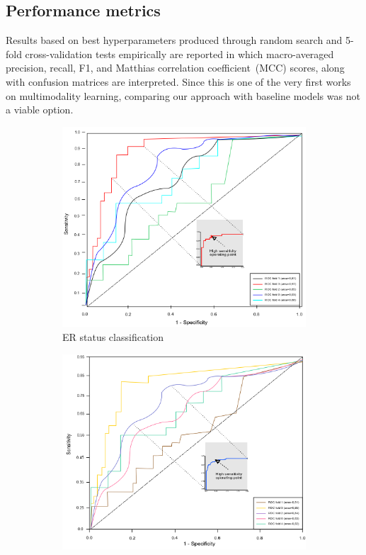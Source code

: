 \subsection{Performance metrics}
Results based on best hyperparameters produced through random search and 5-fold cross-validation tests empirically are reported in which macro-averaged precision, recall, F1, and Matthias correlation coefficient~(MCC) scores, along with confusion matrices are interpreted. Since this is one of the very first works on multimodality learning, comparing our approach with baseline models was not a viable option. 

\iffalse
\begin{figure}
	\centering
	\begin{subfigure}{.49\linewidth}
		\centering
		\includegraphics[width=0.9\linewidth]{images/roc_er.png}
		\caption{ER status classification}
        \label{fig:er_roc}
	\end{subfigure}
	\begin{subfigure}{.49\linewidth}
		\centering
		\includegraphics[width=0.9\linewidth]{images/roc_pgr.png}

\end{subfigure}
\end{figure}
